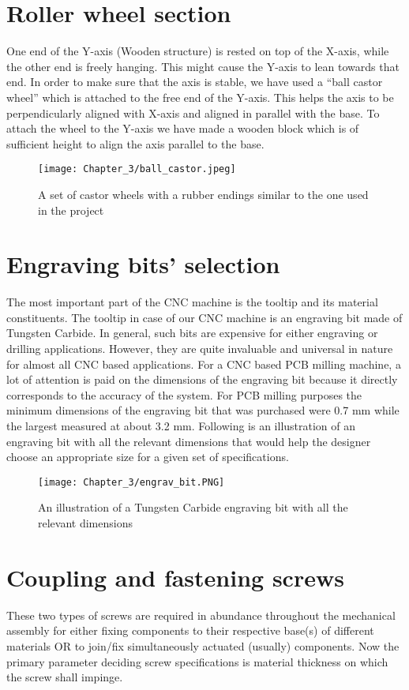 \section{Roller wheel section}

One end of the Y-axis (Wooden structure) is rested on top of the X-axis, while the other end is freely hanging. This might cause the Y-axis to lean towards that end. In order to make sure that the axis is stable, we have used a “ball castor wheel” which is attached to the free end of the Y-axis. This helps the axis to be perpendicularly aligned with X-axis and aligned in parallel with the base. To attach the wheel to the Y-axis we have made a wooden block which is of sufficient height to align the axis parallel to the base.

\begin{figure}[h]
 \centering
 \texttt{[image: Chapter\_3/ball\_castor.jpeg]}
 \caption{A set of castor wheels with a rubber endings similar to the one used in the project}
 \label{fig:ballcastor}
\end{figure}

\section{Engraving bits' selection}

The most important part of the CNC machine is the tooltip and its material constituents. The tooltip in case of our CNC machine is an engraving bit made of Tungsten Carbide. In general, such bits are expensive for either engraving or drilling applications. However, they are quite invaluable and universal in nature for almost all CNC based applications. For a CNC based PCB milling machine, a lot of attention is paid on the dimensions of the engraving bit because it directly corresponds to the accuracy of the system. For PCB milling purposes the minimum dimensions of the engraving bit that was purchased were 0.7 mm while the largest measured at about 3.2 mm. Following is an illustration of an engraving bit with all the relevant dimensions that would help the designer choose an appropriate size for a given set of specifications.

\begin{figure}[h]
 \centering
 \texttt{[image: Chapter\_3/engrav\_bit.PNG]}
 \caption{An illustration of a Tungsten Carbide engraving bit with all the relevant dimensions}
 \label{fig:ebit}
\end{figure}

\section{Coupling and fastening screws} \label{screws}
These two types of screws are required in abundance throughout the mechanical assembly for either fixing components to their respective base(s) of different materials OR to join/fix simultaneously actuated (usually) components. Now the primary parameter deciding screw specifications is material thickness on which the screw shall impinge. \par

